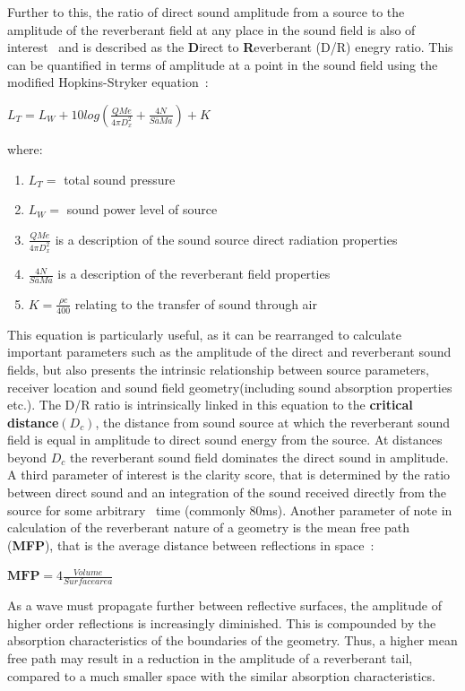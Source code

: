 \documentclass[paper=a4, fontsize=10pt, font=arial]{scrartcl} %
\numberwithin{equation}{section} %
\numberwithin{figure}{section} %
\numberwithin{table}{section} %
\begin{document}
Further to this, the ratio of direct sound amplitude from a source to the amplitude of the reverberant field at any place in the sound field is also of interest~\cite{Begault1995} and is described as the \textbf{D}irect to \textbf{R}everberant (D/R) enegry ratio. This can be quantified in terms of amplitude at a point in the sound field using the modified Hopkins-Stryker equation~\cite{davis2006sound}:\\ 
\begin{center}
$L_T = L_W + 10 log \left( \frac{QMe}{4\pi D_{x}^2} + \frac{4N}{S \overline{a} M a}\right) + K $\\
\end{center}
where:
\begin{enumerate}
\item $L_T =$ total sound pressure
\item $L_W =$ sound power level of source
\item $\frac{QMe}{4\pi D_{x}^2}$ is a description of the sound source direct radiation properties
\item $\frac{4N}{S \overline{a} M a}$ is a description of the reverberant field properties
\item $K = \frac{\rho \textit{c}}{400}$ relating to the transfer of sound through air
\end{enumerate}

This equation is particularly useful, as it can be rearranged to calculate important parameters such as the amplitude of the direct and reverberant sound fields, but also presents the intrinsic relationship between source parameters, receiver location and sound field geometry(including sound absorption properties etc.).
The D/R ratio is intrinsically linked in this equation to the \textbf{critical distance}$(D_c)$, the distance from sound source at which the reverberant sound field is equal in amplitude to direct sound energy from the source. At distances beyond $D_c$ the reverberant sound field dominates the direct sound in amplitude.
A third parameter of interest is the clarity score, that is determined by the ratio between direct sound and an integration of the sound received directly from the source for some arbitrary~\cite{Begault1995} time (commonly 80ms). 
Another parameter of note in calculation of the reverberant nature of a geometry is the mean free path (\textbf{MFP}), that is the average distance between reflections in space~\cite{davis2006sound}:
\begin{center}
$ \textbf{MFP} = 4 \frac{Volume}{Surface area}$
\end{center}
As a wave must propagate further between reflective surfaces, the amplitude of higher order reflections is increasingly diminished. This is compounded by the absorption characteristics of the boundaries of the geometry. Thus, a higher mean free path may result in a reduction in the amplitude of a reverberant tail, compared to a much smaller space with the similar absorption characteristics. 
\end{document}

